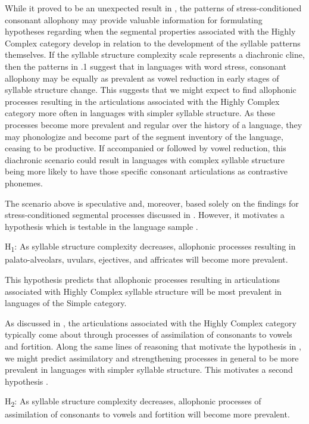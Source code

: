   While it proved to be an unexpected result in , the patterns of stress-conditioned consonant allophony may provide valuable information for formulating hypotheses regarding when the segmental properties associated with the Highly Complex category develop in relation to the development of the syllable patterns themselves. If the syllable structure complexity scale represents a diachronic cline, then the patterns in .1 suggest that in languages with word stress, consonant allophony may be equally as prevalent as vowel reduction in early stages of syllable structure change. This suggests that we might expect to find allophonic processes resulting in the articulations associated with the Highly Complex category more often in languages with simpler syllable structure. As these processes become more prevalent and regular over the history of a language, they may phonologize and become part of the segment inventory of the language, ceasing to be productive. If accompanied or followed by vowel reduction, this diachronic scenario could result in languages with complex syllable structure being more likely to have those specific consonant articulations as contrastive phonemes.

  The scenario above is speculative and, moreover, based solely on the findings for stress-conditioned segmental processes discussed in . However, it motivates a hypothesis which is testable in the language sample .

\ea\label{ex:(7.1)}
  H\textsubscript{1}: As syllable structure complexity decreases, allophonic processes resulting in palato-alveolars, uvulars, ejectives, and affricates will become more prevalent.
\z

This hypothesis predicts that allophonic processes resulting in articulations associated with Highly Complex syllable structure will be most prevalent in languages of the Simple category.

  As discussed in , the articulations associated with the Highly Complex category typically come about through processes of assimilation of consonants to vowels and fortition. Along the same lines of reasoning that motivate the hypothesis in , we might predict assimilatory and strengthening processes in general to be more prevalent in languages with simpler syllable structure. This motivates a second hypothesis .

\ea\label{ex:(7.2)}
  H\textsubscript{2}: As syllable structure complexity decreases, allophonic processes of assimilation of consonants to vowels and fortition will become more prevalent.
\z

